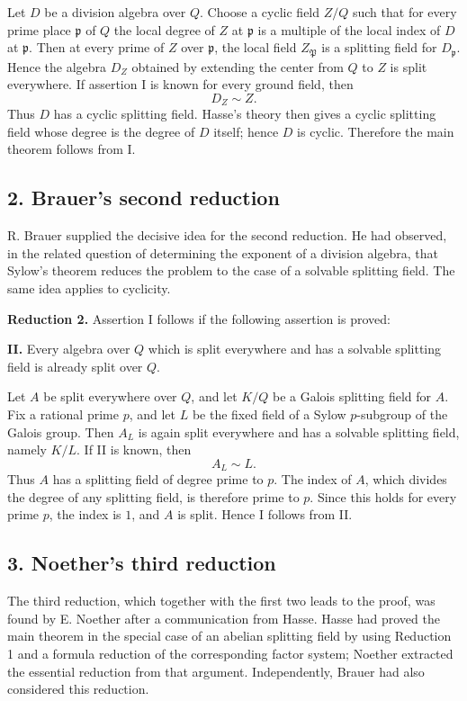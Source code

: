 \documentclass[
  11pt,
]{article}
\begin{document}
Let \(D\) be a division algebra over \(Q\). Choose a cyclic field
\(Z/Q\) such that for every prime place \(\mathfrak p\) of \(Q\) the
local degree of \(Z\) at \(\mathfrak p\) is a multiple of the local
index of \(D\) at \(\mathfrak p\). Then at every prime of \(Z\) over
\(\mathfrak p\), the local field \(Z_{\mathfrak P}\) is a splitting
field for \(D_{\mathfrak p}\). Hence the algebra \(D_Z\) obtained by
extending the center from \(Q\) to \(Z\) is split everywhere. If
assertion I is known for every ground field, then \[
  D_Z\sim Z.
\] Thus \(D\) has a cyclic splitting field. Hasse's theory then gives a
cyclic splitting field whose degree is the degree of \(D\) itself; hence
\(D\) is cyclic. Therefore the main theorem follows from I.

\subsection{2. Brauer's second
reduction}\label{brauers-second-reduction}

R. Brauer supplied the decisive idea for the second reduction. He had
observed, in the related question of determining the exponent of a
division algebra, that Sylow's theorem reduces the problem to the case
of a solvable splitting field. The same idea applies to cyclicity.

\textbf{Reduction 2.} Assertion I follows if the following assertion is
proved:

\textbf{II.} Every algebra over \(Q\) which is split everywhere and has
a solvable splitting field is already split over \(Q\).

Let \(A\) be split everywhere over \(Q\), and let \(K/Q\) be a Galois
splitting field for \(A\). Fix a rational prime \(p\), and let \(L\) be
the fixed field of a Sylow \(p\)-subgroup of the Galois group. Then
\(A_L\) is again split everywhere and has a solvable splitting field,
namely \(K/L\). If II is known, then \[
  A_L\sim L.
\] Thus \(A\) has a splitting field of degree prime to \(p\). The index
of \(A\), which divides the degree of any splitting field, is therefore
prime to \(p\). Since this holds for every prime \(p\), the index is
\(1\), and \(A\) is split. Hence I follows from II.

\subsection{3. Noether's third
reduction}\label{noethers-third-reduction}

The third reduction, which together with the first two leads to the
proof, was found by E. Noether after a communication from Hasse. Hasse
had proved the main theorem in the special case of an abelian splitting
field by using Reduction 1 and a formula reduction of the corresponding
factor system; Noether extracted the essential reduction from that
argument. Independently, Brauer had also considered this reduction.
\end{document}

